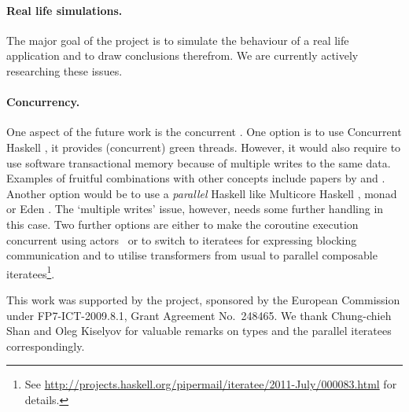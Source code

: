 \paragraph{Real life simulations.}
The major goal of the project is to simulate the behaviour of a real life application and to draw conclusions therefrom.
We are currently actively researching these issues.

\paragraph{Concurrency.}
One aspect of the future work is the concurrent \soosim.
One option is to use Concurrent Haskell \cite{ConcHs}, it provides (concurrent) green threads.
However, it would also require to use software transactional memory \cite{springerlink:10.1007/s004460050028} because of multiple writes to the same data.
Examples of fruitful combinations with other concepts include papers by \citeauthor{Harris:2008:CMT:1378704.1378725} \cite{Harris:2008:CMT:1378704.1378725} and \citeauthor{Bieniusa:2010:BAA:1835698.1835714} \cite{Bieniusa:2010:BAA:1835698.1835714,springerlink:10.1007/978-3-642-25959-3_2}.
Another option would be to use a \emph{parallel} Haskell like Multicore Haskell \cite{marlow:rsm},  monad \cite{par-monad} or Eden \cite{eden}.
The `multiple writes' issue, however, needs some further handling in this case.
Two further options are either to make the coroutine execution concurrent using actors~\cite{Hewitt:1973:UMA:1624775.1624804,sulzmann2008actors} or to switch to iteratees for expressing blocking communication and to utilise transformers from usual to parallel composable iteratees\footnote{See \url{http://projects.haskell.org/pipermail/iteratee/2011-July/000083.html} for details.}.

%

\acks

This work was supported by the \soos project, sponsored by the European Commission under FP7-ICT-2009.8.1, Grant Agreement No.~248465.
We thank Chung-chieh Shan and Oleg Kiselyov for valuable remarks on
 types and the parallel iteratees correspondingly.

